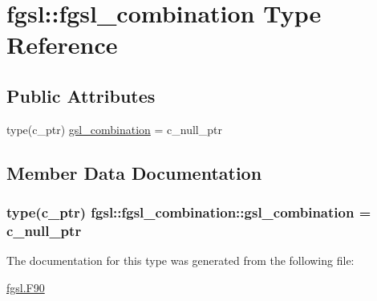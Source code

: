 \hypertarget{structfgsl_1_1fgsl__combination}{\section{fgsl\-:\-:fgsl\-\_\-combination Type Reference}
\label{structfgsl_1_1fgsl__combination}
}
\subsection*{Public Attributes}
\begin{DoxyCompactItemize}
\item 
type(c\-\_\-ptr) \hyperlink{structfgsl_1_1fgsl__combination_a0b58c1a36b36b76ed2fbac172bd7bd97}{gsl\-\_\-combination} = c\-\_\-null\-\_\-ptr
\end{DoxyCompactItemize}


\subsection{Member Data Documentation}
\hypertarget{structfgsl_1_1fgsl__combination_a0b58c1a36b36b76ed2fbac172bd7bd97}{
\subsubsection[{gsl\-\_\-combination}]{\setlength{\rightskip}{0pt plus 5cm}type(c\-\_\-ptr) fgsl\-::fgsl\-\_\-combination\-::gsl\-\_\-combination = c\-\_\-null\-\_\-ptr}}\label{structfgsl_1_1fgsl__combination_a0b58c1a36b36b76ed2fbac172bd7bd97}


The documentation for this type was generated from the following file\-:\begin{DoxyCompactItemize}
\item 
\hyperlink{fgsl_8F90}{fgsl.\-F90}\end{DoxyCompactItemize}
